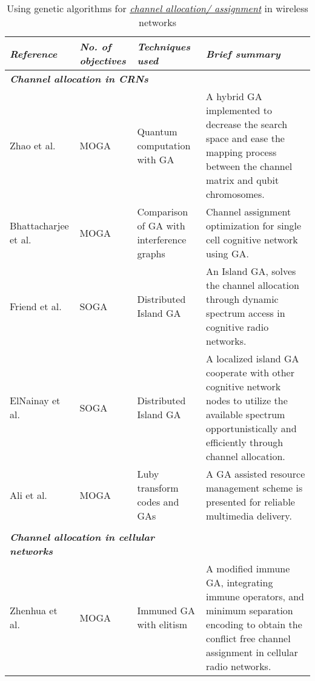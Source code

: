 \documentclass[journal]{IEEEtran}
\begin{document}
\begin{table*}
\caption{Using genetic algorithms for \textit{\underline{channel allocation/ assignment}} in wireless networks}
\centering

\begin{tabular}{p{2.5cm} p{1cm}p{3cm}p{10cm}}
\toprule
\textbf{\emph{Reference}}    &  \textbf{\emph{No. of \newline objectives}} &  \textbf{\emph{Techniques used}}  &  \textbf{\emph{Brief summary}} \\
\midrule

\multicolumn{3}{l}{\textbf{\emph{Channel allocation in CRNs}}} \\

Zhao et al. \cite{zhao2009cognitive}  & MOGA & Quantum computation with GA\cite{narayanan1996quantum} &  A hybrid GA implemented to decrease the search space and ease the mapping process between the channel matrix and qubit chromosomes.\\

Bhattacharjee et al. \cite{bhattacharjee2011channel}  & MOGA & Comparison of GA with interference graphs &  Channel assignment optimization for single cell cognitive network using GA.\\

Friend et al. \cite{friend2008architecture}  & SOGA & Distributed Island GA &  An Island GA, solves the channel allocation through dynamic spectrum access in cognitive radio networks.\\

ElNainay et al. \cite{elnainay2009channel}  & SOGA & Distributed Island GA &  A localized island GA cooperate with other cognitive network nodes to utilize the available spectrum opportunistically and efficiently through channel allocation.\\

Ali et al. \cite{ali2012genetic} & MOGA & Luby transform codes and GAs  & A GA assisted resource management scheme is presented for reliable multimedia delivery.\\



\\
\multicolumn{3}{l}{\textbf{\emph{Channel allocation in cellular networks}}} \\


Zhenhua et al. \cite{zhenhua2010modified}  &  MOGA & Immuned GA with elitism &  A modified immune GA, integrating immune operators, and minimum separation encoding to obtain the conflict free channel assignment in cellular radio networks.\\


\end{tabular}
\end{table*}
\end{document}
